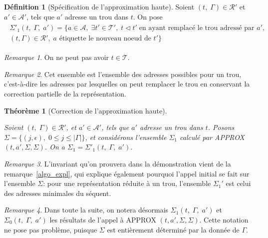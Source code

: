 \documentclass[11pt,a4paper]{article}
\theoremstyle{plain}
\newtheorem{theorem}{Théorème}
\theoremstyle{definition}
\newtheorem{definition}{Définition}
\theoremstyle{remark}
\newtheorem{remark}{Remarque}
\newcommand*{\sequent}{\Gamma}
\newcommand*{\addresses}{\ensuremath{\mathcal{A}}}
\newcommand*{\treeaddresses}{\ensuremath{\mathcal{A'}}}
\newcommand*{\trees}{\ensuremath{\mathcal{T}}}
\newcommand*{\treespartial}{\ensuremath{\mathcal{T'}}}
\newcommand*{\representationspartial}{\ensuremath{\mathcal{R'}}}
\newcommand*{\relapprox}{\ensuremath{\triangleleft}}
\newcommand*{\lowapprox}{\ensuremath{\Sigma_0}}
\newcommand*{\highapprox}{\ensuremath{\Sigma_1}}
\newcommand*{\highapproxspec}{\ensuremath{\Sigma'_1}}
\begin{document}
\begin{definition}[Spécification de l'approximation haute]
    Soient $(t, \; \sequent) \in \representationspartial$ et $a' \in \treeaddresses$, tels que $a'$ adresse un trou dans $t$. On pose
    \begin{align*}
        \begin{multlined}
            \highapproxspec \left( t, \; \sequent, \; a' \right) = \{ a \in \addresses, \; \exists t' \in \treespartial, \; t \relapprox t' \; \text{en ayant remplacé le trou adressé par $a'$}, \\
            (t, \sequent) \in \representationspartial, \; \text{$a$ étiquette le nouveau noeud de $t'$} \}
        \end{multlined}
    \end{align*}

    \begin{remark}
         On ne peut pas avoir $t \in \trees$.
    \end{remark}

    \begin{remark}
         Cet ensemble est l'ensemble des adresses possibles pour un trou, c'est-à-dire les adresses par lesquelles on peut remplacer le trou en conservant la correction partielle de la représentation.
    \end{remark}
\end{definition}

\begin{theorem}[Correction de l'approximation haute]
    \label{highapprox_correction}
    
    Soient $(t, \; \sequent) \in \representationspartial$, et $a' \in \treeaddresses$, tels que $a'$ adresse un trou dans $t$. Posons $\Sigma = \{ (j, \epsilon), \; 0 \leq j \leq |\sequent| \}$, et considérons l'ensemble $\highapprox$ calculé par APPROX$(t, a', \Sigma, \Sigma)$.
    On a $\highapprox = \highapproxspec \left( t, \; \sequent, \; a' \right)$.
\end{theorem}

\begin{remark}
    L'invariant qu'on prouvera dans la démonstration vient de la remarque~\ref{algo_expl}, qui explique également pourquoi l'appel initial se fait sur l'ensemble $\Sigma$: pour une représentation réduite à un trou, l'ensemble $\highapprox'$ est celui des adresses minimales du séquent.
\end{remark}

\begin{remark}
    Dans toute la suite, on notera désormais $\highapprox \left( t, \; \sequent, \; a' \right)$ et $\lowapprox \left( t, \; \sequent, \; a' \right)$ les résultats de l'appel à APPROX $(t, a', \Sigma, \Sigma)$. Cette notation ne pose pas problème, puisque $\Sigma$ est entièrement déterminé par la donnée de $\sequent$.
\end{remark}
\end{document}
